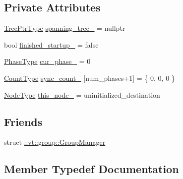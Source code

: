 \subsection*{Private Attributes}
\begin{DoxyCompactItemize}
\item 
\hyperlink{structvt_1_1group_1_1global_1_1_default_group_ab4b43c814196cd22463cfa0caad333d6}{Tree\+Ptr\+Type} \hyperlink{structvt_1_1group_1_1global_1_1_default_group_a7bd444da79d0d358ba921446ae372808}{spanning\+\_\+tree\+\_\+} = nullptr
\item 
bool \hyperlink{structvt_1_1group_1_1global_1_1_default_group_a206241b82e6234ce815e9dde56a5838b}{finished\+\_\+startup\+\_\+} = false
\item 
\hyperlink{namespacevt_1_1group_1_1global_a1ad2576a1029e469969bdcd577122ee3}{Phase\+Type} \hyperlink{structvt_1_1group_1_1global_1_1_default_group_a8c11bc6f6047aa2794548397fbc88b85}{cur\+\_\+phase\+\_\+} = 0
\item 
\hyperlink{structvt_1_1group_1_1global_1_1_default_group_a838e3ed0bd877d6ff703705c00c66e95}{Count\+Type} \hyperlink{structvt_1_1group_1_1global_1_1_default_group_a51f66e9ed5df681da2c0896930adfa77}{sync\+\_\+count\+\_\+} \mbox{[}num\+\_\+phases+1\mbox{]} = \{ 0, 0, 0 \}
\item 
\hyperlink{namespacevt_a866da9d0efc19c0a1ce79e9e492f47e2}{Node\+Type} \hyperlink{structvt_1_1group_1_1global_1_1_default_group_a541865b66d88e4afa0331f3f5378d5a4}{this\+\_\+node\+\_\+} = uninitialized\+\_\+destination
\end{DoxyCompactItemize}
\subsection*{Friends}
\begin{DoxyCompactItemize}
\item 
struct \hyperlink{structvt_1_1group_1_1global_1_1_default_group_ab9d2dc7a29fd794bd88aff6d07f90527}{\+::vt\+::group\+::\+Group\+Manager}
\end{DoxyCompactItemize}


\subsection{Member Typedef Documentation}
\mbox{\label{structvt_1_1group_1_1global_1_1_default_group_a838e3ed0bd877d6ff703705c00c66e95}} 
